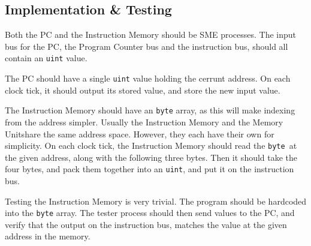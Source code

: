 \documentclass{beamer}
\begin{document}
\subsection{Implementation \& Testing}
\begin{frame}
    Both the PC and the Instruction Memory should be SME processes. The input
    bus for the PC, the Program Counter bus and the instruction bus, should all
    contain an \texttt{uint} value.

    \vspace{\baselineskip}
    The PC should have a single \texttt{uint} value holding the cerrunt
    address. On each clock tick, it should output its stored value, and store
    the new input value.
\end{frame}
\begin{frame}
    The Instruction Memory should have an \texttt{byte} array, as this will
    make indexing from the address simpler. Usually the Instruction Memory and
    the Memory Unitshare the same address space. However, they each have their
    own for simplicity. On each clock tick, the Instruction Memory should read
    the \texttt{byte} at the given address, along with the following three
    bytes. Then it should take the four bytes, and pack them together into an
    \texttt{uint}, and put it on the instruction bus.
\end{frame}
\begin{frame}
    Testing the Instruction Memory is very trivial. The program should be
    hardcoded into the \texttt{byte} array. The tester process should then send
    values to the PC, and verify that the output on the instruction bus,
    matches the value at the given address in the memory.
\end{frame}
\end{document}
